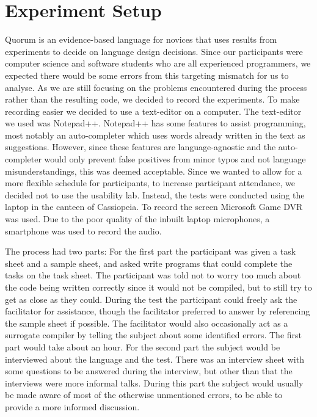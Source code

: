 \chapter{Experiment Setup}
Quorum is an evidence-based language for novices that uses results from experiments to decide on language design decisions.
Since our participants were computer science and software students who are all experienced programmers, we expected there would be some errors from this targeting mismatch for us to analyse.
As we are still focusing on the problems encountered during the process rather than the resulting code, we decided to record the experiments.
To make recording easier we decided to use a text-editor on a computer.
The text-editor we used was Notepad++\cite{Notepad}.
Notepad++ has some features to assist programming, most notably an auto-completer which uses words already written in the text as suggestions.
However, since these features are language-agnostic and the auto-completer would only prevent false positives from minor typos and not language misunderstandings, this was deemed acceptable.
Since we wanted to allow for a more flexible schedule for participants, to increase participant attendance, we decided not to use the usability lab.
Instead, the tests were conducted using the laptop in the canteen of Cassiopeia.
To record the screen Microsoft Game DVR was used.
Due to the poor quality of the inbuilt laptop microphones, a smartphone was used to record the audio.%

The process had two parts:
For the first part the participant was given a task sheet and a sample sheet, and asked write programs that could complete the tasks on the task sheet.
The participant was told not to worry too much about the code being written correctly since it would not be compiled, but to still try to get as close as they could.
During the test the participant could freely ask the facilitator for assistance, though the facilitator preferred to answer by referencing the sample sheet if possible.
The facilitator would also occasionally act as a surrogate compiler by telling the subject about some identified errors.%
The first part would take about an hour.
For the second part the subject would be interviewed about the language and the test.
There was an interview sheet with some questions to be answered during the interview, but other than that the interviews were more informal talks.
During this part the subject would usually be made aware of most of the otherwise unmentioned errors, to be able to provide a more informed discussion.


